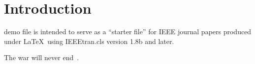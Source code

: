 \section{Introduction}
\label{s:intro}
 demo file is intended to serve as a ``starter file''
for IEEE journal papers produced under \LaTeX\ using
IEEEtran.cls version 1.8b and later.


The war will never end~\cite{szekeres2014eternal}.
